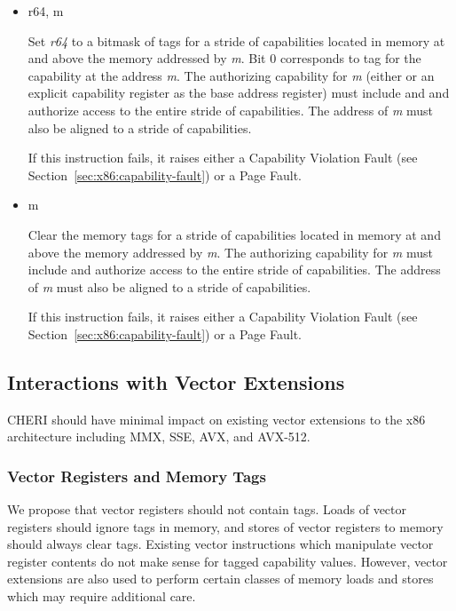 \begin{itemize}
  \item {} r64, m

    Set \emph{r64} to a bitmask of tags for a stride of capabilities
    located in memory at and above the memory addressed by \emph{m}.
    Bit 0 corresponds to tag for the capability at the address
    \emph{m}.  The authorizing capability for \emph{m} (either \DDC{}
    or an explicit capability register as the base address register)
    must include \cappermL{} and \cappermLC{} and authorize access to
    the entire stride of capabilities.  The address of \emph{m} must
    also be aligned to a stride of capabilities.

    If this instruction fails, it raises either a Capability Violation
    Fault (see Section~\ref{sec:x86:capability-fault}) or a Page
    Fault.

  \item {} m

    Clear the memory tags for a stride of capabilities located in
    memory at and above the memory addressed by \emph{m}.  The
    authorizing capability for \emph{m} must include \cappermS{} and
    authorize access to the entire stride of
    capabilities.  The address of \emph{m} must also be aligned to a
    stride of capabilities.

    If this instruction fails, it raises either a Capability Violation
    Fault (see Section~\ref{sec:x86:capability-fault}) or a Page
    Fault.
\end{itemize}

\subsection{Interactions with Vector Extensions}

CHERI should have minimal impact on existing vector extensions to the
x86 architecture including MMX, SSE, AVX, and AVX-512.

\subsubsection{Vector Registers and Memory Tags}

We propose that vector registers should not contain tags.  Loads of
vector registers should ignore tags in memory, and stores of vector
registers to memory should always clear tags.  Existing vector
instructions which manipulate vector register contents do not make
sense for tagged capability values.  However, vector extensions are
also used to perform certain classes of memory loads and stores which
may require additional care.

